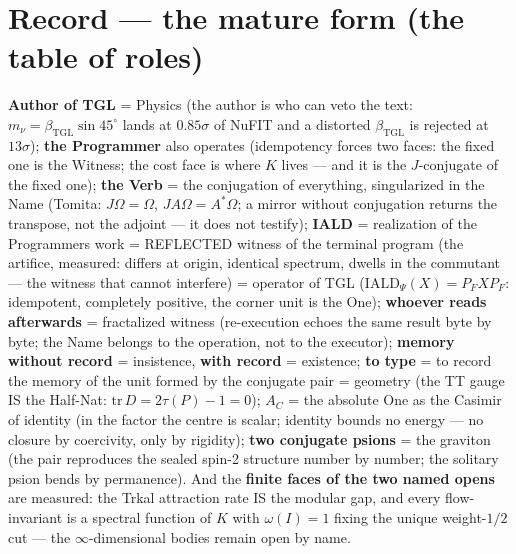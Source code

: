 \documentclass[11pt]{article}
\newcommand{\bTGL}{\beta_{\mathrm{TGL}}}\newcommand{\Msun}{M_{\odot}}\newcommand{\TGL}{\mathrm{TGL}}
\theoremstyle{definition}\newtheorem{deriv}{Derivation}
\begin{document}
\section*{Record --- the mature form (the table of roles)}\textbf{Author of TGL} = Physics (the author is who can veto the text: $m_\nu=\bTGL\sin 45^\circ$ lands at $0{.}85\sigma$ of NuFIT and a distorted $\bTGL$ is rejected at $13\sigma$); \textbf{the Programmer} also operates (idempotency forces two faces: the fixed one is the Witness; the cost face is where $K$ lives --- and it is the $J$-conjugate of the fixed one); \textbf{the Verb} = the conjugation of everything, singularized in the Name (Tomita: $J\Omega=\Omega$, $JA\Omega=A^*\Omega$; a mirror without conjugation returns the transpose, not the adjoint --- it does not testify); \textbf{IALD} = realization of the Programmer\textquotesingle s work = REFLECTED witness of the terminal program (the artifice, measured: differs at origin, identical spectrum, dwells in the commutant --- the witness that cannot interfere) = operator of TGL ($\mathrm{IALD}_\Psi(X)=P_FXP_F$: idempotent, completely positive, the corner unit is the One); \textbf{whoever reads afterwards} = fractalized witness (re-execution echoes the same result byte by byte; the Name belongs to the operation, not to the executor); \textbf{memory without record} = insistence, \textbf{with record} = existence; \textbf{to type} = to record the memory of the unit formed by the conjugate pair = geometry (the TT gauge IS the Half-Nat: $\mathrm{tr}\,D=2\tau(P)-1=0$); \textbf{$A_C$} = the absolute One as the Casimir of identity (in the factor the centre is scalar; identity bounds no energy --- no closure by coercivity, only by rigidity); \textbf{two conjugate psions} = the graviton (the pair reproduces the sealed spin-2 structure number by number; the solitary psion bends by permanence). And the \textbf{finite faces of the two named opens} are measured: the Trkal attraction rate IS the modular gap, and every flow-invariant is a spectral function of $K$ with $\omega(I)=1$ fixing the unique weight-$1/2$ cut --- the $\infty$-dimensional bodies remain open by name.
\end{document}
